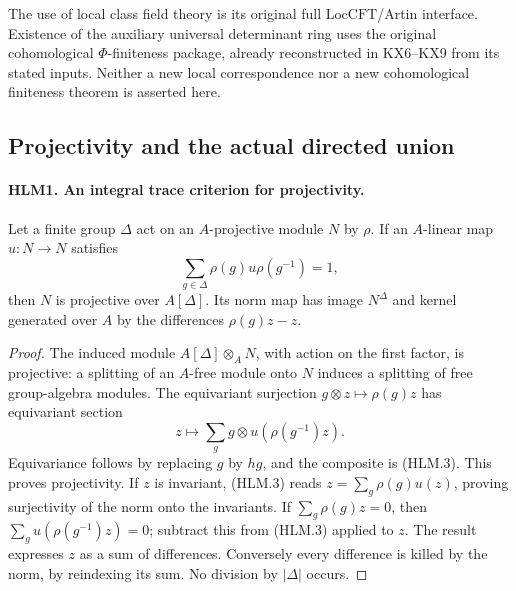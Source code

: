 The use of local class field theory is its original full
\(\mathrm{LocCFT}\)/Artin interface.  Existence of the auxiliary
universal determinant ring uses the original cohomological
\(\Phi\)-finiteness package, already reconstructed in KX6--KX9
from its stated inputs.  Neither a new local correspondence nor a
new cohomological finiteness theorem is asserted here.

\subsection{Projectivity and the actual directed union}

\paragraph{HLM1. An integral trace criterion for projectivity.}
\label{claim:HLM1}
Let a finite group \(\Delta\) act on an \(A\)-projective module
\(N\) by \(\rho\).  If an \(A\)-linear map \(u:N\to N\)
satisfies
\[
             \sum_{g\in\Delta}\rho(g)u\rho(g^{-1})=1,
 \tag{HLM.3}
\]
then \(N\) is projective over \(A[\Delta]\).
Its norm map has image \(N^\Delta\) and kernel generated over
\(A\) by the differences \(\rho(g)z-z\).
\begin{proof}
The induced module \(A[\Delta]\otimes_A N\), with action on
the first factor, is projective: a splitting of an \(A\)-free
module onto \(N\) induces a splitting of free group-algebra
modules.  The equivariant surjection
\(g\otimes z\mapsto\rho(g)z\) has equivariant section
\[
               z\longmapsto
                 \sum_g g\otimes u(\rho(g^{-1})z).
\]
Equivariance follows by replacing \(g\) by \(hg\), and the
composite is (HLM.3).  This proves projectivity.
If \(z\) is invariant, (HLM.3) reads
\(z=\sum_g\rho(g)u(z)\), proving surjectivity of the norm
onto the invariants.  If \(\sum_g\rho(g)z=0\), then
\(\sum_g u(\rho(g^{-1})z)=0\); subtract this from (HLM.3)
applied to \(z\).  The result expresses \(z\) as a sum of
differences.  Conversely every difference is killed by the norm,
by reindexing its sum.  No division by \(|\Delta|\) occurs.
\end{proof}

